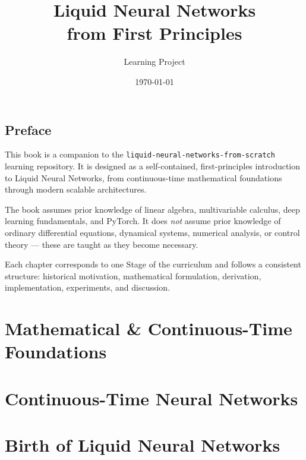 \documentclass[12pt,letterpaper,oneside,openany]{book}
\title{Liquid Neural Networks \\ from First Principles}
\author{Learning Project}
\date{\today}
\begin{document}
\frontmatter

\maketitle

\chapter*{Preface}

This book is a companion to the \texttt{liquid-neural-networks-from-scratch} learning repository.
It is designed as a self-contained, first-principles introduction to Liquid Neural Networks, from
continuous-time mathematical foundations through modern scalable architectures.

The book assumes prior knowledge of linear algebra, multivariable calculus, deep learning fundamentals,
and PyTorch. It does \emph{not} assume prior knowledge of ordinary differential equations, dynamical
systems, numerical analysis, or control theory — these are taught as they become necessary.

Each chapter corresponds to one Stage of the curriculum and follows a consistent structure:
historical motivation, mathematical formulation, derivation, implementation, experiments, and discussion.

\tableofcontents

\mainmatter

\part{Mathematical \& Continuous-Time Foundations}






\part{Continuous-Time Neural Networks}




\part{Birth of Liquid Neural Networks}
\end{document}
